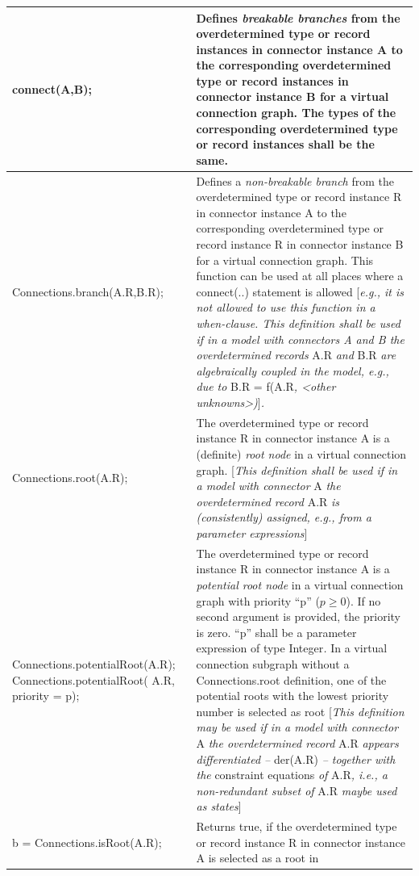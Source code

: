 \documentclass[10pt,a4paper]{report}
\begin{document}
\begin{longtable}[]{|p{5cm}|p{9cm}|}
\hline
connect(A,B); & Defines \emph{breakable branches} from the
overdetermined type or record instances in connector instance A to the
corresponding overdetermined type or record instances in connector
instance B for a virtual connection graph. The types of the
corresponding overdetermined type or record instances shall be the
same.\\ \hline
Connections.branch(A.R,B.R); & Defines a \emph{non-breakable branch}
from the overdetermined type or record instance R in connector instance
A to the corresponding overdetermined type or record instance R in
connector instance B for a virtual connection graph. This function can
be used at all places where a connect(..) statement is allowed
{[}\emph{e.g., it is not allowed to use this function in a when-clause.
This definition shall be used if in a model with connectors A and B the
overdetermined records} A.R \emph{and} B.R \emph{are algebraically
coupled in the model, e.g., due to} B.R = f(A.R\emph{, \textless{}other
unknowns\textgreater{})}{]}\emph{.}\\ \hline
Connections.root(A.R); & The overdetermined type or record instance R in
connector instance A is a (definite) \emph{root node} in a virtual
connection graph. {[}\emph{This definition shall be used if in a model
with connector} A \emph{the overdetermined record} A.R \emph{is
(consistently) assigned, e.g., from a parameter
expressions}{]}\\ \hline
Connections.potentialRoot(A.R);
Connections.potentialRoot(\newline
A.R, priority = p);
&
The overdetermined type or record instance R in connector instance A is
a \emph{potential root node} in a virtual connection graph with priority
``p'' ($p\ge 0$). If no second argument is provided, the priority is zero.
``p'' shall be a parameter expression of type Integer\emph{.} In a
virtual connection subgraph without a Connections.root definition, one
of the potential roots with the lowest priority number is selected as
root {[}\emph{This definition may be used if in a model with connector}
A \emph{the overdetermined record} A.R \emph{appears differentiated --}
der(A.R) \emph{-- together with the} constraint equations \emph{of}
A.R\emph{, i.e., a non-redundant subset of} A.R \emph{maybe used as
states}{]}
\\ \hline
b = Connections.isRoot(A.R); & Returns true, if the overdetermined type
or record instance R in connector instance A is selected as a root in

\end{longtable}
\end{document}
